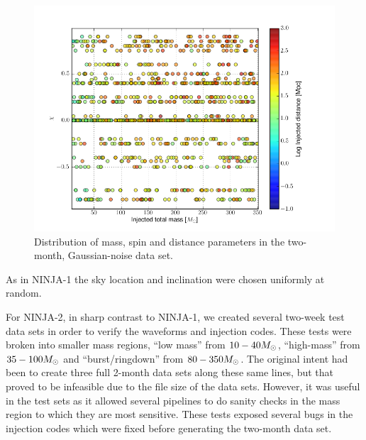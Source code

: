 \begin{figure}
  \includegraphics[width=\linewidth]{figures/ninja2/ninja2_dataset.png}
  \caption[Parameters of the NINJA-2 two-month data set]{
  \label{f:ninja2_dataset}
Distribution of mass, spin and distance parameters in the two-month,
Gaussian-noise data set.
}
\end{figure}%


As in NINJA-1 the sky location and inclination were chosen uniformly
at random.

For NINJA-2, in sharp contrast to NINJA-1, we created several two-week
test data sets in order to verify the waveforms and injection codes.
These tests were broken into smaller mass regions, ``low mass'' from
$10-40 M_\odot$, ``high-mass'' from $35-100 M_\odot$ and
``burst/ringdown'' from $80-350 M_\odot$.  The original intent had been
to create three full 2-month data sets along these same lines, but
that proved to be infeasible due to the file size of the data sets.
However, it was useful in the test sets as it allowed several
pipelines to do sanity checks in the mass region to which they are
most sensitive.  These tests exposed several bugs in the injection
codes which were fixed before generating the two-month data set.

